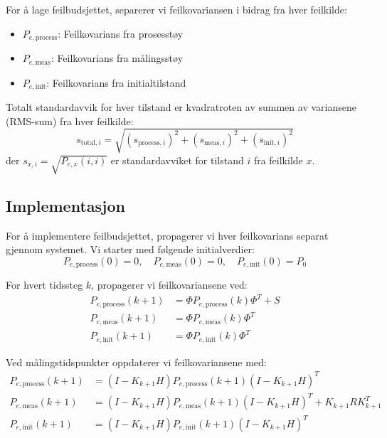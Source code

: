 \documentclass[a4paper,12pt]{article}
\theoremstyle{plain}
\begin{document}
For å lage feilbudsjettet, separerer vi feilkovariansen i bidrag fra hver feilkilde:
\begin{itemize}
    \item $P_{e,\text{process}}$: Feilkovarians fra prosesstøy
    \item $P_{e,\text{meas}}$: Feilkovarians fra målingsstøy
    \item $P_{e,\text{init}}$: Feilkovarians fra initialtilstand
\end{itemize}

Totalt standardavvik for hver tilstand er kvadratroten av summen av variansene (RMS-sum) fra hver feilkilde:
\begin{equation}
s_{\text{total},i} = \sqrt{(s_{\text{process},i})^2 + (s_{\text{meas},i})^2 + (s_{\text{init},i})^2}
\end{equation}
der $s_{x,i} = \sqrt{P_{e,x}(i,i)}$ er standardavviket for tilstand $i$ fra feilkilde $x$.

\subsection{Implementasjon}

For å implementere feilbudsjettet, propagerer vi hver feilkovarians separat gjennom systemet. Vi starter med følgende initialverdier:
\begin{equation}
P_{e,\text{process}}(0) = 0, \quad P_{e,\text{meas}}(0) = 0, \quad P_{e,\text{init}}(0) = P_0
\end{equation}

For hvert tidssteg $k$, propagerer vi feilkovariansene ved:
\begin{align}
P_{e,\text{process}}(k+1) &= \Phi P_{e,\text{process}}(k) \Phi^T + S \\
P_{e,\text{meas}}(k+1) &= \Phi P_{e,\text{meas}}(k) \Phi^T \\
P_{e,\text{init}}(k+1) &= \Phi P_{e,\text{init}}(k) \Phi^T
\end{align}

Ved målingstidspunkter oppdaterer vi feilkovariansene med:
\begin{align}
P_{e,\text{process}}(k+1) &= (I - K_{k+1}H)P_{e,\text{process}}(k+1)(I - K_{k+1}H)^T \\
P_{e,\text{meas}}(k+1) &= (I - K_{k+1}H)P_{e,\text{meas}}(k+1)(I - K_{k+1}H)^T + K_{k+1}RK_{k+1}^T \\
P_{e,\text{init}}(k+1) &= (I - K_{k+1}H)P_{e,\text{init}}(k+1)(I - K_{k+1}H)^T
\end{align}
\end{document}
